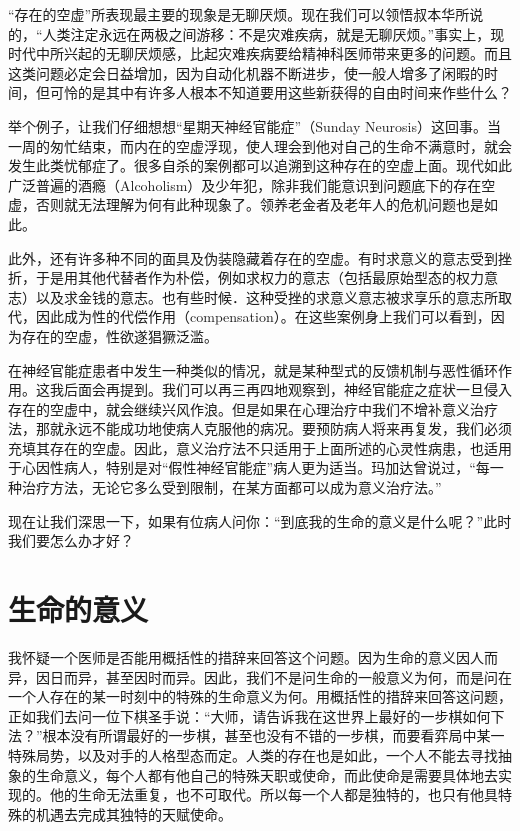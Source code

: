 \documentclass[11pt,oneside]{book}
\begin{document}
\begin{common-format}
“存在的空虚”所表现最主要的现象是无聊厌烦。现在我们可以领悟叔本华所说的，“人类注定永远在两极之间游移：不是灾难疾病，就是无聊厌烦。”事实上，现时代中所兴起的无聊厌烦感，比起灾难疾病要给精神科医师带来更多的问题。而且这类问题必定会日益增加，因为自动化机器不断进步，使一般人增多了闲暇的时间，但可怜的是其中有许多人根本不知道要用这些新获得的自由时间来作些什么？

举个例子，让我们仔细想想“星期天神经官能症”（Sunday Neurosis）这回事。当一周的匆忙结束，而内在的空虚浮现，使人理会到他对自己的生命不满意时，就会发生此类忧郁症了。很多自杀的案例都可以追溯到这种存在的空虚上面。现代如此广泛普遍的酒瘾（Alcoholism）及少年犯，除非我们能意识到问题底下的存在空虚，否则就无法理解为何有此种现象了。领养老金者及老年人的危机问题也是如此。

此外，还有许多种不同的面具及伪装隐藏着存在的空虚。有时求意义的意志受到挫折，于是用其他代替者作为朴偿，例如求权力的意志（包括最原始型态的权力意志）以及求金钱的意志。也有些时候．这种受挫的求意义意志被求享乐的意志所取代，因此成为性的代偿作用（compensation）。在这些案例身上我们可以看到，因为存在的空虚，性欲遂猖獗泛滥。

在神经官能症患者中发生一种类似的情况，就是某种型式的反馈机制与恶性循环作用。这我后面会再提到。我们可以再三再四地观察到，神经官能症之症状一旦侵入存在的空虚中，就会继续兴风作浪。但是如果在心理治疗中我们不增补意义治疗法，那就永远不能成功地使病人克服他的病况。要预防病人将来再复发，我们必须充填其存在的空虚。因此，意义治疗法不只适用于上面所述的心灵性病患，也适用于心因性病人，特别是对“假性神经官能症”病人更为适当。玛加达曾说过，“每一种治疗方法，无论它多么受到限制，在某方面都可以成为意义治疗法。”

现在让我们深思一下，如果有位病人问你：“到底我的生命的意义是什么呢？”此时我们要怎么办才好？


\section{生命的意义}
我怀疑一个医师是否能用概括性的措辞来回答这个问题。因为生命的意义因人而异，因日而异，甚至因时而异。因此，我们不是问生命的一般意义为何，而是问在一个人存在的某一时刻中的特殊的生命意义为何。用概括性的措辞来回答这问题，正如我们去问一位下棋圣手说：“大师，请告诉我在这世界上最好的一步棋如何下法？”根本没有所谓最好的一步棋，甚至也没有不错的一步棋，而要看弈局中某一特殊局势，以及对手的人格型态而定。人类的存在也是如此，一个人不能去寻找抽象的生命意义，每个人都有他自己的特殊天职或使命，而此使命是需要具体地去实现的。他的生命无法重复，也不可取代。所以每一个人都是独特的，也只有他具特殊的机遇去完成其独特的天赋使命。


\end{common-format}
\end{document}
